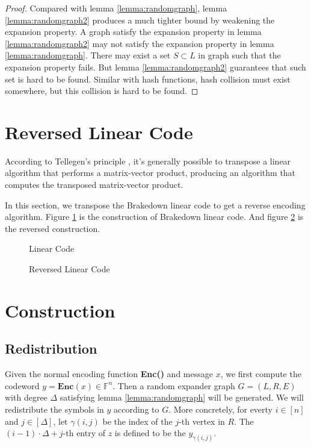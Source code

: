 \begin{proof}
Compared with lemma \ref{lemma:randomgraph}, lemma \ref{lemma:randomgraph2} produces a much tighter bound by weakening the expansion property. A graph satisfy the expansion property in lemma \ref{lemma:randomgraph2} may not satisfy the expansion property in lemma \ref{lemma:randomgraph}. There may exist a set $S \subset L$ in graph such that the expansion property fails. But lemma \ref{lemma:randomgraph2} guarantees that such set is hard to be found. Similar with hash functions, hash collision must exist somewhere, but this collision is hard to be found.

\end{proof}

\section{Reversed Linear Code}

According to Tellegen’s principle \cite{Tellegen}, it's generally possible to transpose a linear algorithm that performs a matrix-vector product, producing an algorithm that computes the transposed matrix-vector product.

In this section, we transpose the Brakedown linear code to get a reverse encoding algorithm. Figure \ref{fig:lc} is the construction of Brakedown linear code. And figure \ref{fig:lc-rev} is the reversed construction.


\begin{figure}[h]
\centering

\caption{Linear Code}
\label{fig:lc}
\end{figure}



\begin{figure}[h]
\centering

\caption{Reversed Linear Code}
\label{fig:lc-rev}
\end{figure}


\section{Construction}

\subsection{Redistribution}

Given the normal encoding function \textbf{Enc()} and message $x$, we first compute the codeword $y = \textbf{Enc}(x) \in \mathbb{F}^n$. Then a random expander graph $G = (L, R, E)$ with degree $\Delta$ satisfying lemma \ref{lemma:randomgraph} will be generated. We will redistribute the symbols in $y$ according to $G$. More concretely, for everty $i \in [n]$ and $j \in [\Delta]$, let $\gamma(i, j)$ be the index of the $j$-th vertex in $R$. The $(i - 1) \cdot \Delta + j$-th entry of $z$ is defined to be the $y_{\gamma(i, j)}$.

